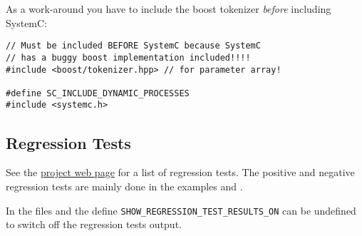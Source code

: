 As a work-around you have to include the boost tokenizer {\em before} including SystemC:

\noindent
\begin{minipage}{\textwidth}
\begin{lstlisting}
// Must be included BEFORE SystemC because SystemC 
// has a buggy boost implementation included!!!!
#include <boost/tokenizer.hpp> // for parameter array!

#define SC_INCLUDE_DYNAMIC_PROCESSES
#include <systemc.h>
\end{lstlisting}
\end{minipage}

\subsection{Regression Tests}
\label{GAVRegressionTests}

See the \hyperlink{GAVProjectWebPage}{project web page} for a list of regression tests. The positive and negative regression tests are mainly done in the examples  and .

In the files  and  the define \lstinline|SHOW_REGRESSION_TEST_RESULTS_ON| can be undefined to switch off the regression tests output.